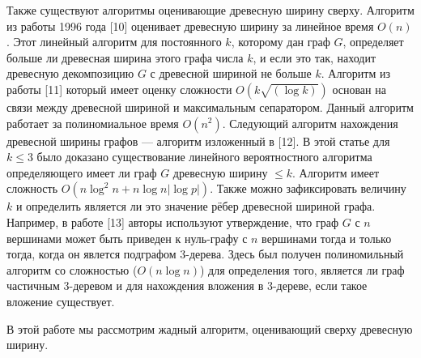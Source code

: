 \documentclass[a4paper,12pt]{article}
\begin{document}
\begin{large}
		Также существуют алгоритмы оценивающие древесную ширину сверху.
		Алгоритм из работы 1996 года [10] оценивает древесную ширину за линейное время $O(n)$.
		Этот линейный алгоритм для постоянного $k$, которому дан граф $G$, определяет больше ли древесная ширина этого графа числа $k$, и если это так, находит древесную декомпозицию $G$ с древесной шириной не больше $k$.
		Алгоритм из работы [11] который имеет оценку сложности $O(k\sqrt{(\log{k})})$ основан на связи между древесной шириной и максимальным сепаратором. Данный алгоритм работает за полиномиальное время $O(n^2)$.
		Следующий алгоритм нахождения древесной ширины графов --- алгоритм изложенный в [12].
		В этой статье для $k \leq 3$ было доказано существование линейного вероятностного алгоритма определяющего имеет ли граф $G$ древесную ширину $\leq k$.
		Алгоритм имеет сложность $O(n\log^2{n}+n\log{n}|\log{p}|)$.
		Также можно зафиксировать величину $k$ и определить является ли это значение рёбер древесной шириной графа. 
		Например, в работе [13] авторы используют утверждение, что граф $G$ с $n$ вершинами может быть приведен к нуль-графу с $n$ вершинами тогда и только тогда, когда он явлется подграфом 3-дерева. 
		Здесь был получен полиномильный алгоритм со сложностью ($O(n\log{n})$) для определения того, является ли граф частичным 3-деревом и для нахождения вложения в 3-дереве, если такое вложение существует.
		
		В этой работе мы рассмотрим жадный алгоритм, оценивающий сверху древесную ширину.

		\end{large}

		\newpage
\end{document}
